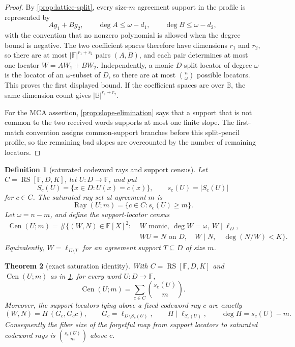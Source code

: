 \documentclass[a4paper,11pt]{amsart}
\newtheorem{theorem}{Theorem}[section]
\newtheorem{definition}[theorem]{Definition}
\theoremstyle{remark}
\newcommand{\F}{\mathbb F}
\newcommand{\B}{\mathbb B}
\newcommand{\RS}{\operatorname{RS}}
\newcommand{\Cen}{\operatorname{Cen}}
\begin{document}
\begin{proof}
By \cref{prop:lattice-split}, every size-\(m\) agreement support in the profile is represented by
\[
        Ag_1+Bg_2,
        \qquad
        \deg A\le\omega-d_1,
        \qquad
        \deg B\le\omega-d_2,
\]
with the convention that no nonzero polynomial is allowed when the degree bound is negative.  The two coefficient spaces therefore have dimensions \(r_1\) and \(r_2\), so there are at most \(|\F|^{r_1+r_2}\) pairs \((A,B)\), and each pair determines at most one locator \(W=AW_1+BW_2\).  Independently, a monic \(D\)-split locator of degree \(\omega\) is the locator of an \(\omega\)-subset of \(D\), so there are at most \(\binom n\omega\) possible locators.  This proves the first displayed bound.  If the coefficient spaces are over \(\B\), the same dimension count gives \(|\B|^{r_1+r_2}\).

For the MCA assertion, \cref{prop:slope-elimination} says that a support that is not common to the two received words supports at most one finite slope.  The first-match convention assigns common-support branches before this split-pencil profile, so the remaining bad slopes are overcounted by the number of remaining locators.
\end{proof}


\begin{definition}[saturated codeword rays and support census]\label{def:saturated-rays}
Let \(C=\RS[\F,D,K]\), let \(U:D\to\F\), and put
\[
        S_c(U)=\{x\in D:U(x)=c(x)\},\qquad s_c(U)=|S_c(U)|
\]
for \(c\in C\).  The saturated ray set at agreement \(m\) is
\[
        \operatorname{Ray}(U;m)=\{c\in C:s_c(U)\ge m\}.
\]
Let \(\omega=n-m\), and define the support-locator census
\[
\begin{aligned}
\Cen(U;m)=\#\{(W,N)\in \F[X]^2:\;& W\text{ monic},\ \deg W=\omega,\ W\mid \ell_D,\\
        & WU=N\text{ on }D,\quad W\mid N,\quad \deg(N/W)<K\}.
\end{aligned}
\]
Equivalently, \(W=\ell_{D\setminus T}\) for an agreement support \(T\subseteq D\) of size \(m\).
\end{definition}

\begin{theorem}[exact saturation identity]\label{thm:saturation}
With \(C=\RS[\F,D,K]\) and \(\Cen(U;m)\) as in \cref{def:saturated-rays}, for every word \(U:D\to\F\),
\[
        \Cen(U;m)=\sum_{c\in C}\binom{s_c(U)}m .
\]
Moreover, the support locators lying above a fixed codeword ray \(c\) are exactly
\[
        (W,N)=H\,(G_c,G_cc),
        \qquad
        G_c=\ell_{D\setminus S_c(U)},
        \qquad
        H\mid\ell_{S_c(U)},
        \qquad
        \deg H=s_c(U)-m .
\]
Consequently the fiber size of the forgetful map from support locators to saturated codeword rays is \(\binom{s_c(U)}m\) above \(c\).
\end{theorem}
\end{document}
